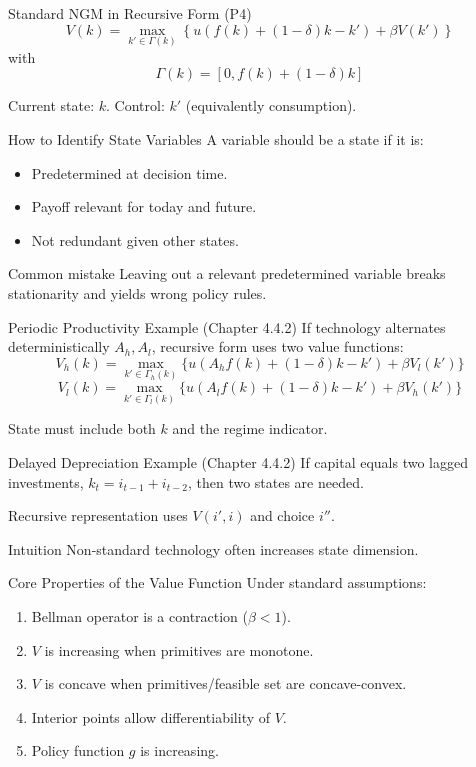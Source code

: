 \documentclass[aspectratio=169,10pt]{beamer}
\begin{document}
\begin{frame}{Standard NGM in Recursive Form (P4)}
\[
V(k)=\max_{k'\in\Gamma(k)}\left\{u\left(f(k)+(1-\delta)k-k'\right)+\beta V(k')\right\}
\]
with
\[
\Gamma(k)=[0,f(k)+(1-\delta)k]
\]

Current state: $k$. Control: $k'$ (equivalently consumption).
\end{frame}

\begin{frame}{How to Identify State Variables}
A variable should be a state if it is:
\begin{itemize}
  \item Predetermined at decision time.
  \item Payoff relevant for today and future.
  \item Not redundant given other states.
\end{itemize}

\begin{block}{Common mistake}
Leaving out a relevant predetermined variable breaks stationarity and yields wrong policy rules.
\end{block}
\end{frame}

\begin{frame}{Periodic Productivity Example (Chapter 4.4.2)}
If technology alternates deterministically $A_h, A_l$, recursive form uses two value functions:
\[
V_h(k)=\max_{k'\in\Gamma_h(k)}\{u(A_hf(k)+(1-\delta)k-k')+\beta V_l(k')\}
\]
\[
V_l(k)=\max_{k'\in\Gamma_l(k)}\{u(A_lf(k)+(1-\delta)k-k')+\beta V_h(k')\}
\]

State must include both $k$ and the regime indicator.
\end{frame}

\begin{frame}{Delayed Depreciation Example (Chapter 4.4.2)}
If capital equals two lagged investments, $k_t=i_{t-1}+i_{t-2}$, then two states are needed.

\medskip
Recursive representation uses $V(i',i)$ and choice $i''$.

\begin{block}{Intuition}
Non-standard technology often increases state dimension.
\end{block}
\end{frame}

\begin{frame}{Core Properties of the Value Function}
Under standard assumptions:
\begin{enumerate}
  \item Bellman operator is a contraction ($\beta<1$).
  \item $V$ is increasing when primitives are monotone.
  \item $V$ is concave when primitives/feasible set are concave-convex.
  \item Interior points allow differentiability of $V$.
  \item Policy function $g$ is increasing.
\end{enumerate}
\end{frame}
\end{document}
